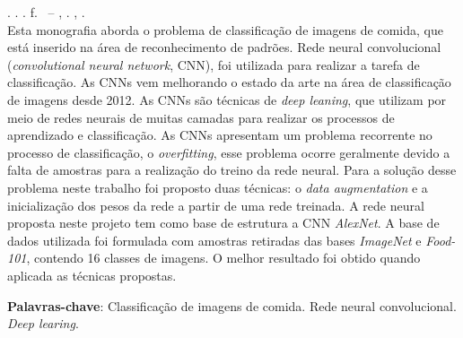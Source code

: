 
\begin{resumo}[RESUMO]
\begin{SingleSpacing}

\imprimirautorcitacao. \imprimirtitulo. \imprimirdata. \pageref {LastPage} f. \imprimirprojeto\ – \imprimirprograma, \imprimirinstituicao. \imprimirlocal, \imprimirdata.\\

Esta monografia aborda o problema de classificação de imagens de comida, que está inserido na área de reconhecimento de padrões. Rede neural convolucional (\textit{convolutional neural network}, CNN), foi utilizada para realizar a tarefa de classificação. As CNNs vem melhorando o estado da arte na área de classificação de imagens desde 2012. As CNNs são técnicas de \textit{deep leaning}, que utilizam por meio de redes neurais de muitas camadas para realizar os processos de aprendizado e classificação. As CNNs apresentam um problema recorrente no processo de classificação, o \textit{overfitting}, esse problema ocorre geralmente devido a falta de amostras para a realização do treino da rede neural. Para a solução desse problema neste trabalho foi proposto duas técnicas: o \textit{data augmentation} e a inicialização dos pesos da rede a partir de uma rede treinada. A rede neural proposta neste projeto tem como base de estrutura a CNN \textit{AlexNet}. A base de dados utilizada foi formulada com amostras retiradas das bases \textit{ImageNet} e \textit{Food-101}, contendo 16 classes de imagens. O melhor resultado foi obtido quando aplicada as técnicas propostas.

\textbf{Palavras-chave}: Classificação de imagens de comida. Rede neural convolucional. \textit{Deep learing}.

\end{SingleSpacing}
\end{resumo}


